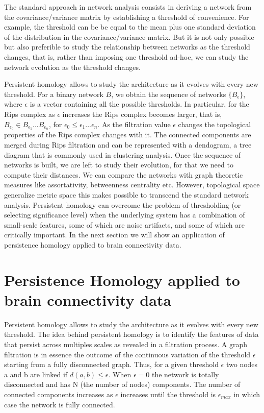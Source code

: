 \documentclass[onecollarge,runningheads]{svjour2}
\begin{document}
The standard approach in network analysis consists in deriving a network from the covariance/variance matrix by establishing a threshold of convenience. For example, the threshold can be be equal to the mean plus one standard deviation of the distribution in the covariance/variance matrix. But it is not only possible but also preferible to study the relationship between networks as the threshold changes, that is, rather than imposing one threshold ad-hoc, we can study the network evolution as the threshold changes. 

Persistent homology allows to study the architecture as it evolves with every new threshold. For a binary network $B$, we obtain the sequence of networks $\{B_{\epsilon}\}$, where $\epsilon$ is a vector containing all the possible thresholds. In particular, for the Rips complex as $\epsilon$ increases the Rips complex becomes larger, that is, $B_{\epsilon_0} \in B_{\epsilon_1} ... B_{\epsilon_n}$, for $\epsilon_0 \leq \epsilon_1 ...\epsilon_n$. As the filtration value $\epsilon$ changes the topological properties of the Rips complex changes with it.
The connected components are merged during Rips filtration and can be represented with a dendogram, a tree diagram that is commonly used in clustering analysis.
Once the sequence of networks is built, we are left to study their evolution, for that we need to compute their distances. We can compare the networks with graph theoretic measures like assortativity, betweenness centrality etc. However, topological space generalize metric space this makes possible to transcend the standard network analysis.
Persistent homology can overcome the problem of thresholding (or selecting significance level) when the underlying system has a combination of small-scale features, some of which are noise artifacts, and some of which are critically important. In the next section we will show an application of persistence homology applied to brain connectivity data. 


\section{Persistence Homology applied to brain connectivity data}
\label{se:exa}

Persistent homology allows to study the architecture as it evolves with every new threshold. The idea behind 
persistent homology is to identify the features of data that persist across multiples scales as revealed in a filtration process. A graph filtration is in essence the outcome of the continuous variation of the threshold $\epsilon$ starting from a fully disconnected graph. Thus, for a given threshold $\epsilon$ two nodes a and b are linked if $d(a, b) \leq \epsilon$. When $\epsilon = 0$ the network is totally disconnected and has N (the number of nodes) components. The number of connected components increases as $\epsilon$ increases until the threshold is $\epsilon_{max}$ in which case the network is fully connected. 
\end{document}
